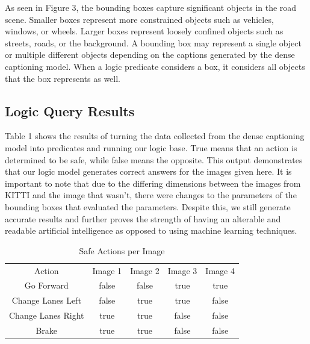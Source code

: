 As seen in Figure 3, the bounding boxes capture significant objects in the road scene. Smaller boxes represent more constrained objects such as vehicles, windows, or wheels. Larger boxes represent loosely confined objects such as streets, roads, or the background. A bounding box may represent a single object or multiple different objects depending on the captions generated by the dense captioning model. When a logic predicate considers a box, it considers all objects that the box represents as well.

\subsection{Logic Query Results}
Table 1 shows the results of turning the data collected from the dense captioning model into predicates and running our logic base. True means that an action is determined to be safe, while false means the opposite. This output demonstrates that our logic model generates correct answers for the images given here. It is important to note that due to the differing dimensions between the images from KITTI and the image that wasn't, there were changes to the parameters of the bounding boxes that evaluated the parameters. Despite this, we still generate accurate results and further proves the strength of having an alterable and readable artificial intelligence as opposed to using machine learning techniques.

\begin{table}[htbp]
\caption{Safe Actions per Image}
\begin{center}
\begin{tabular}{|c|c|c|c|c|}
\hline
Action& Image 1& Image 2& Image 3& Image 4 \\
Go Forward& false& false& true& true \\
Change Lanes Left& false& true& true& false \\
Change Lanes Right& true& true& false& false \\
Brake& true& true& false& false \\
\hline
\end{tabular}
\end{center}
\end{table}

